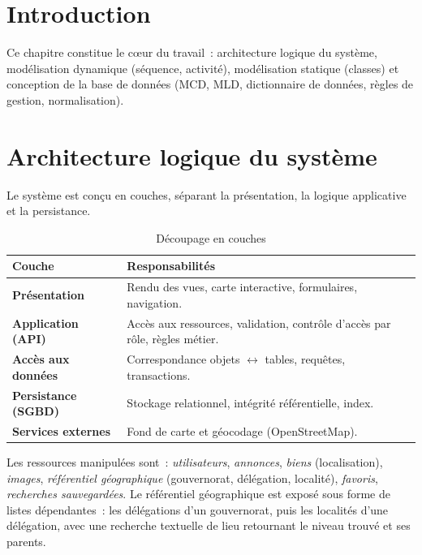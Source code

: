 
\section*{Introduction}
Ce chapitre constitue le cœur du travail~: architecture logique du système,
modélisation dynamique (séquence, activité), modélisation statique (classes) et
conception de la base de données (MCD, MLD, dictionnaire de données, règles de
gestion, normalisation).

\section{Architecture logique du système}
\label{sec:archi-logicielle}

Le système est conçu en couches, séparant la présentation, la logique
applicative et la persistance.

\begin{table}[H]
\centering
\renewcommand{\arraystretch}{1.25}
\begin{tabularx}{\linewidth}{>{\bfseries}p{3.2cm} X}
\toprule
Couche & Responsabilités \\
\midrule
Présentation      & Rendu des vues, carte interactive, formulaires, navigation. \\
Application (API) & Accès aux ressources, validation, contrôle d'accès par rôle, règles métier. \\
Accès aux données & Correspondance objets $\leftrightarrow$ tables, requêtes, transactions. \\
Persistance (SGBD) & Stockage relationnel, intégrité référentielle, index. \\
Services externes & Fond de carte et géocodage (OpenStreetMap). \\
\bottomrule
\end{tabularx}
\caption{Découpage en couches}
\label{tab:couches}
\end{table}

Les ressources manipulées sont~: \emph{utilisateurs}, \emph{annonces},
\emph{biens} (localisation), \emph{images}, \emph{référentiel géographique}
(gouvernorat, délégation, localité), \emph{favoris}, \emph{recherches
sauvegardées}. Le référentiel géographique est exposé sous forme de listes
dépendantes~: les délégations d'un gouvernorat, puis les localités d'une
délégation, avec une recherche textuelle de lieu retournant le niveau trouvé et
ses parents.

